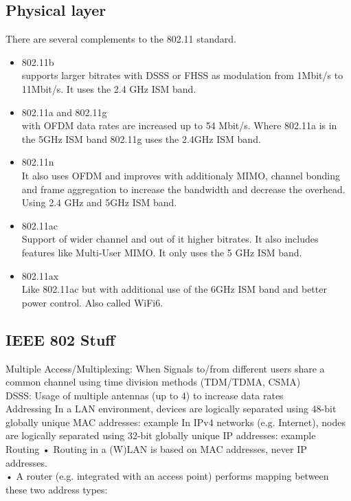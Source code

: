 \documentclass[]{ccs-thesis}
\begin{document}
\subsection{Physical layer}
There are several complements to the 802.11 standard.
\begin{itemize}
	\item 802.11b \\
	supports larger bitrates with \ac{DSSS} or \ac{FHSS} as modulation from 1Mbit/s to 11Mbit/s.
	It uses the 2.4 GHz ISM band.
	\item 802.11a and 802.11g \\
	with \ac{OFDM} data rates are increased up to 54 Mbit/s.
	Where 802.11a is in the 5GHz ISM band 802.11g uses the 2.4GHz ISM band.
	\item 802.11n\\
	It also uses \ac{OFDM} and improves with additionaly \ac{MIMO}, channel bonding and frame aggregation to increase the bandwidth and decrease the overhead.
	Using 2.4 GHz and 5GHz ISM band.
	\item 802.11ac\\
	Support of wider channel and out of it higher bitrates. It also includes features like Multi-User MIMO.
	It only uses the 5 GHz ISM band.
	\item 802.11ax\\
	Like 802.11ac but with additional use of the 6GHz ISM band and better power control. 
	Also called WiFi6.
\end{itemize}

\subsection{IEEE 802 Stuff}
Multiple Access/Multiplexing: When Signals to/from different users share a common channel using time division methods (TDM/TDMA, CSMA)\\

DSSS: Usage of multiple antennas
(up to 4) to increase data rates\\

Addressing
In a LAN environment, devices are logically separated using 48-bit
globally unique MAC addresses: example
In IPv4 networks (e.g. Internet), nodes are logically separated
using 32-bit globally unique IP addresses: example \\

Routing
• Routing in a (W)LAN is based on MAC addresses, never IP addresses.\\
• A router (e.g. integrated with an access point) performs mapping between\\
these two address types: \\
\end{document}
